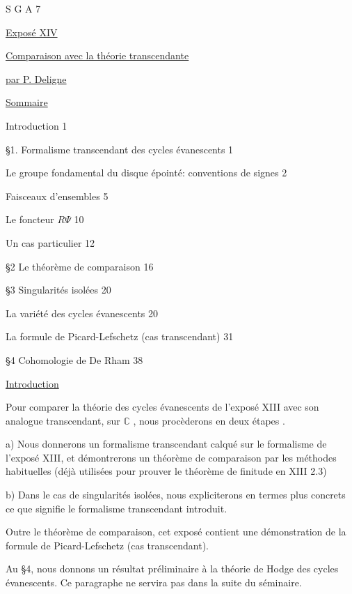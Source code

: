 


S G A  7


\underline{Exposé XIV}


\underline{\underline{Comparaison avec la théorie transcendante}}


\underline{par P. Deligne}


\underline{Sommaire}

\quad Introduction \hfill 1

\S 1. \quad Formalisme transcendant des cycles évanescents \hfill 1

 Le groupe fondamental du disque épointé: conventions de signes \hfill 2

 Faisceaux d'ensembles \hfill 5

 Le foncteur $R\Psi$ \hfill 10

 Un cas particulier \hfill 12

\S 2 \quad Le théorème de comparaison \hfill 16

\S 3 \quad Singularités isolées \hfill 20

 La variété des cycles évanescents \hfill 20

 La formule de Picard-Lefschetz (cas transcendant) \hfill 31

\S 4 \quad Cohomologie de De Rham \hfill 38


\underline{Introduction}

Pour comparer la théorie des cycles évanescents de l'exposé XIII avec son analogue transcendant, sur $\mathbb{C}$ , nous procèderons en deux étapes .

a) Nous donnerons un formalisme transcendant calqué sur le formalisme de l'exposé XIII, et démontrerons un théorème de comparaison par les méthodes habituelles (déjà utilisées pour prouver le théorème de finitude en XIII 2.3)

b) Dans le cas de singularités isolées, nous expliciterons en termes plus concrets ce que signifie le formalisme transcendant introduit.

Outre le théorème de comparaison, cet exposé contient une démonstration de la formule de Picard-Lefschetz (cas transcendant).



Au \S 4, nous donnons un résultat préliminaire à la théorie de Hodge des cycles évanescents. Ce paragraphe ne servira pas dans la suite du séminaire.



